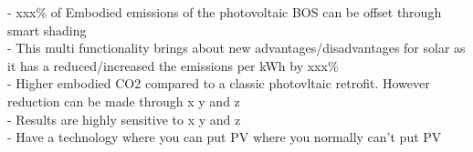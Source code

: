 
- xxx\% of Embodied emissions of the photovoltaic BOS can be offset through smart shading\\
- This multi functionality brings about new advantages/disadvantages for solar as it has a reduced/increased the emissions per kWh by xxx\% \\
- Higher embodied CO2 compared to a classic photovltaic retrofit. However reduction can be made through x y and z\\
- Results are highly sensitive to x y and z\\
- Have a technology where you can put PV where you normally can't put PV